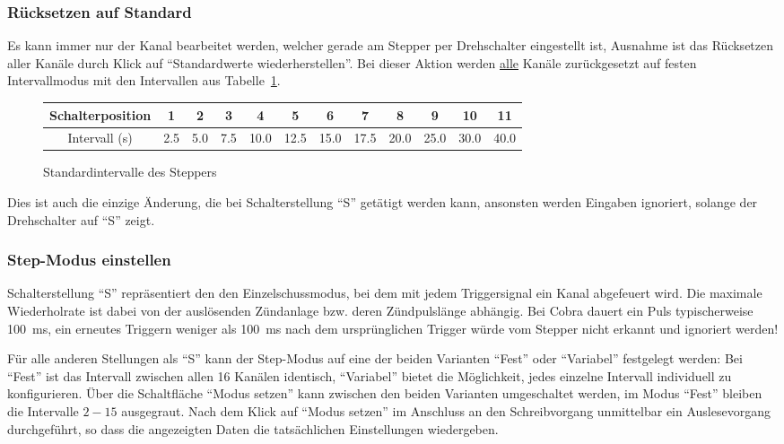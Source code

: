 \documentclass[paper=a4, open=any]{scrbook}
\begin{document}
				\subsubsection*{Rücksetzen auf Standard}
				Es kann immer nur der Kanal bearbeitet werden, welcher gerade am Stepper per Drehschalter eingestellt ist, Ausnahme ist das Rücksetzen aller Kanäle durch Klick auf \enquote{Standardwerte wiederherstellen}. Bei dieser Aktion werden \underline{alle} Kanäle zurückgesetzt auf festen Intervallmodus mit den Intervallen aus Tabelle~\ref{tab:standardintervalle}.

				\begin{figure}
					\begin{center}
						\begin{longtabu} [c]{c|*{11}c}
							Schalterposition & 1   & 2   & 3   & 4    & 5    & 6    & 7    & 8    & 9    & 10   & 11   \\ \hline
							Intervall (s)    & 2.5 & 5.0 & 7.5 & 10.0 & 12.5 & 15.0 & 17.5 & 20.0 & 25.0 & 30.0 & 40.0
						\end{longtabu}
					\end{center}
					\caption{Standardintervalle des Steppers}
					\label{tab:standardintervalle}
				\end{figure}

				Dies ist auch die einzige Änderung, die bei Schalterstellung \enquote{S} getätigt werden kann, ansonsten werden Eingaben ignoriert, solange der Drehschalter auf \enquote{S} zeigt.

			\subsubsection*{Step-Modus einstellen}
			
				Schalterstellung \enquote{S} repräsentiert den den Einzelschussmodus, bei dem mit jedem Triggersignal ein Kanal abgefeuert wird. Die maximale Wiederholrate ist dabei von der auslösenden Zündanlage bzw. deren Zündpulslänge abhängig. Bei Cobra dauert ein Puls typischerweise \SI{100}{\milli\second}, ein erneutes Triggern weniger als \SI{100}{\milli\second} nach dem ursprünglichen Trigger würde vom Stepper nicht erkannt und ignoriert werden!
				
				Für alle anderen Stellungen als \enquote{S} kann der Step-Modus auf eine der beiden Varianten \enquote{Fest} oder \enquote{Variabel} festgelegt werden: Bei \enquote{Fest} ist das Intervall zwischen allen 16 Kanälen identisch, \enquote{Variabel} bietet die Möglichkeit, jedes einzelne Intervall individuell zu konfigurieren. Über die Schaltfläche \enquote{Modus setzen} kann zwischen den beiden Varianten umgeschaltet werden, im Modus \enquote{Fest} bleiben die Intervalle $2-15$ ausgegraut. Nach dem Klick auf \enquote{Modus setzen} im Anschluss an den Schreibvorgang unmittelbar ein Auslesevorgang durchgeführt, so dass die angezeigten Daten die tatsächlichen Einstellungen wiedergeben.				
				
\end{document}
